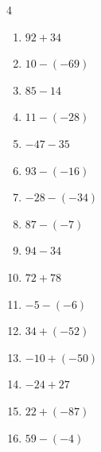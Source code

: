 \begin{multicols}{4}
\begin{enumerate}
  \item $92+34$

        \phantom{$=126$}

  \item $10-(-69)$

        \phantom{$=79$}

  \item $85-14$

        \phantom{$=71$}

  \item $11-(-28)$

        \phantom{$=39$}

  \item $-47-35$

        \phantom{$=-82$}

  \item $93-(-16)$

        \phantom{$=109$}

  \item $-28-(-34)$

        \phantom{$=6$}

  \item $87-(-7)$

        \phantom{$=94$}

  \item $94-34$

        \phantom{$=60$}

  \item $72+78$

        \phantom{$=150$}

  \item $-5-(-6)$

        \phantom{$=1$}

  \item $34+(-52)$

        \phantom{$=-18$}

  \item $-10+(-50)$

        \phantom{$=-60$}

\columnbreak %

  \item $-24+27$

        \phantom{$=3$}

  \item $22+(-87)$

        \phantom{$=-65$}

  \item $59-(-4)$


\end{enumerate}
\end{multicols}
